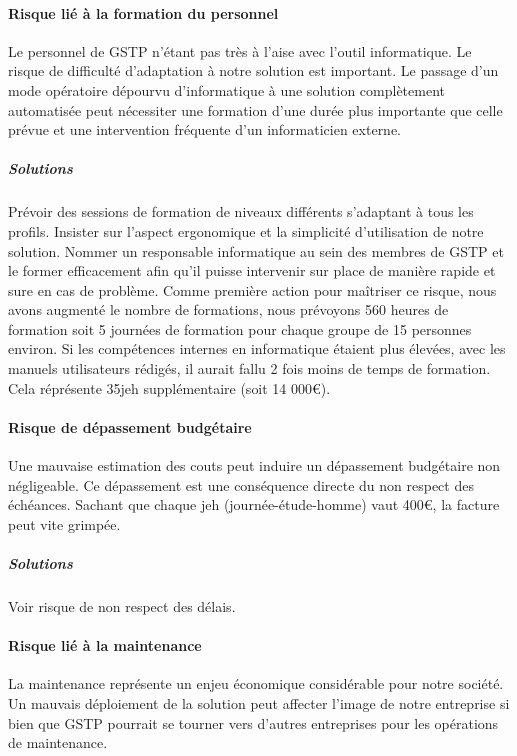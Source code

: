 \paragraph{Risque lié à la formation du personnel\\}
Le personnel de GSTP n'étant pas très à l'aise avec l'outil informatique. Le risque de difficulté d'adaptation à notre solution est important. Le passage d'un mode opératoire dépourvu d'informatique à une solution complètement automatisée peut nécessiter une formation d'une durée plus importante que celle prévue et une intervention fréquente d'un informaticien externe.

\subparagraph{Solutions\\}
Prévoir des sessions de formation de niveaux différents s'adaptant à tous les profils. Insister sur l'aspect ergonomique et la simplicité d'utilisation
de notre solution. Nommer un responsable informatique au sein des membres de GSTP et le former efficacement afin qu'il puisse intervenir sur place de manière rapide et sure en cas de problème.
Comme première action pour maîtriser ce risque, nous avons augmenté le nombre de formations, nous prévoyons 560 heures de formation soit 5 journées
de formation pour chaque groupe de 15 personnes environ. Si les compétences internes en informatique étaient plus élevées, avec les manuels utilisateurs rédigés, il aurait fallu 2 fois moins de temps de formation. Cela réprésente 35jeh supplémentaire (soit 14 000€).

\paragraph{Risque de dépassement budgétaire\\}
Une mauvaise estimation des couts peut induire un dépassement budgétaire non négligeable. Ce dépassement est une conséquence directe du non respect des échéances. Sachant que chaque jeh (journée-étude-homme) vaut 400€, la facture peut vite grimpée.

\subparagraph{Solutions\\}
Voir risque de non respect des délais.

\paragraph{Risque lié à la maintenance\\}
La maintenance représente un enjeu économique considérable pour notre société. Un mauvais déploiement de la solution peut affecter l'image de notre entreprise si bien que GSTP pourrait se tourner vers d'autres entreprises pour les opérations de maintenance.

